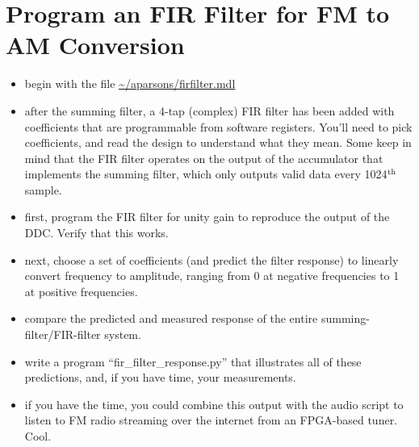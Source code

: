\documentclass[11pt]{article}
\begin{document}
\section{Program an FIR Filter for FM to AM Conversion}

\begin{itemize}
\item begin with the file \url{~/aparsons/firfilter.mdl}
\item after the summing filter, a 4-tap (complex) FIR filter has been added with coefficients that 
are programmable from software registers.  You'll need to pick coefficients, and read the design to understand
what they mean.  Some keep in mind that the FIR filter operates on
the output of the accumulator that implements the summing
filter, which only outputs valid data every 1024$^{\rm th}$ sample.
\item first, program the FIR filter for unity gain to reproduce the output of the DDC.  Verify that this works.
\item next, choose a set of coefficients (and predict the filter response) to linearly convert frequency to
amplitude, ranging from 0 at negative frequencies to 1 at positive frequencies.
\item compare the predicted and measured response of the entire summing-filter/FIR-filter system.  
\item write a program ``fir\_filter\_response.py'' that illustrates all of these predictions, and, if you have
time, your measurements.
\item if you have the time, you could combine this output with the audio script to listen to FM radio
streaming over the internet from an FPGA-based tuner.  Cool.
\end{itemize}
\end{document}
